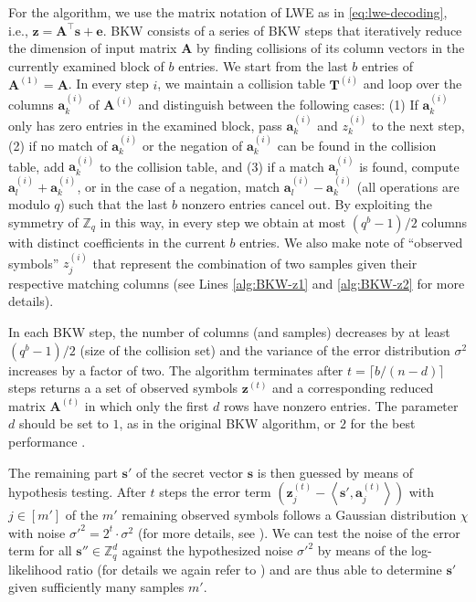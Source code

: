For the algorithm, we use the matrix notation of LWE as in \cref{eq:lwe-decoding}, i.e., $\mathbf{z} = \mathbf{A}^\intercal \mathbf{s} + \mathbf{e}$. BKW consists of a series of BKW steps that iteratively reduce the dimension of input matrix $\mathbf{A}$ by finding collisions of its column vectors in the currently examined block of $b$ entries. We start from the last $b$ entries of $\mathbf{A}^{(1)} = \mathbf{A}$. In every step $i$, we maintain a collision table $\mathbf{T}^{(i)}$ and loop over the columns $\mathbf{a}_k^{(i)}$ of $\mathbf{A}^{(i)}$ and distinguish between the following cases: (1) If $\mathbf{a}_k^{(i)}$ only has zero entries in the examined block, pass $\mathbf{a}_k^{(i)}$ and $z_k^{(i)}$ to the next step, (2) if no match of $\mathbf{a}_k^{(i)}$ or the negation of $\mathbf{a}_k^{(i)}$ can be found in the collision table, add $\mathbf{a}_k^{(i)}$ to the collision  table, and (3) if a match $\mathbf{a}_l^{(i)}$ is found, compute $\mathbf{a}_l^{(i)} + \mathbf{a}_k^{(i)}$, or in the case of a negation, match $\mathbf{a}_l^{(i)} - \mathbf{a}_k^{(i)}$ (all operations are modulo $q$) such that the last $b$ nonzero entries cancel out. By exploiting the symmetry of $\mathbb{Z}_q$ in this way, in every step we obtain at most $(q^b - 1)/2$ columns with distinct coefficients in the current $b$ entries. We also make note of ``observed symbols'' $z_j^{(i)}$ that represent the combination of two samples given their respective matching columns (see Lines \ref{alg:BKW-z1} and \ref{alg:BKW-z2} for more details).

In each BKW step, the number of columns (and samples) decreases by at least $(q^b - 1)/2$ (size of the collision set) and the variance of the error distribution $\sigma^2$ increases by a factor of two. The algorithm terminates after $t = \lceil b / (n - d)\rceil$ steps returns a a set of observed symbols $\mathbf{z}^{(t)}$ and a corresponding reduced matrix $\mathbf{A}^{(t)}$ in which only the first $d$ rows have nonzero entries. The parameter $d$ should be set to $1$, as in the original BKW algorithm, or $2$ for the best performance \cite{ACFFP15a}.

The remaining part $\mathbf{s}'$ of the secret vector $\mathbf{s}$ is then guessed by means of hypothesis testing. After $t$ steps the error term $\left(\mathbf{z}_j^{(t)} - \left\langle \mathbf{s}', \mathbf{a}_j^{(t)}\right\rangle\right)$ with $j \in [m']$ of the $m'$ remaining observed symbols follows a Gaussian distribution $\chi$ with noise $\sigma'^2 = 2^t\cdot \sigma^2$ (for more details, see \cite[Lemma~1]{ACFFP15a}). %
We can test the noise of the error term for all $\mathbf{s}'' \in \mathbb{Z}_q^d$ against the hypothesized noise  $\sigma'^2$ by means of the log-likelihood ratio (for details we again refer to \cite{ACFFP15a}) and are thus able to determine $\mathbf{s}'$ given sufficiently many samples $m'$.

